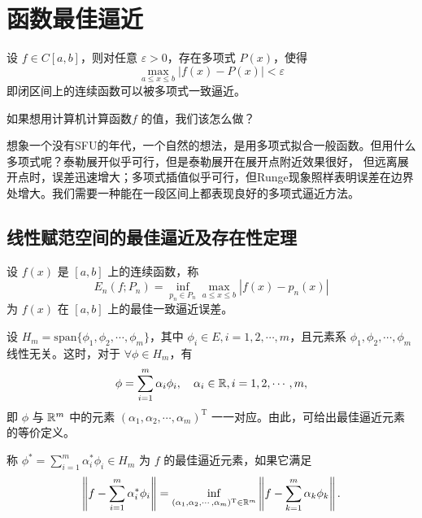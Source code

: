 \chapter{函数最佳逼近}

\begin{theorem}
    设 \(f \in C[a, b]\)，则对任意 \(\varepsilon > 0\)，存在多项式 \(P(x)\)，使得
    \[
        \max_{a \le x \le b} |f(x) - P(x)| < \varepsilon
    \]
    即闭区间上的连续函数可以被多项式一致逼近。
\end{theorem}

如果想用计算机计算函数\(f\) 的值，我们该怎么做？

想象一个没有SFU的年代，一个自然的想法，是用多项式拟合一般函数。但用什么多项式呢？泰勒展开似乎可行，但是泰勒展开在展开点附近效果很好，
但远离展开点时，误差迅速增大；多项式插值似乎可行，但Runge现象照样表明误差在边界处增大。我们需要一种能在一段区间上都表现良好的多项式逼近方法。

\section{线性赋范空间的最佳逼近及存在性定理}
\begin{definition}
    设 \(f(x)\) 是 \([a, b]\) 上的连续函数，称
    \begin{equation}
        E_n(f; P_n) = \inf_{p_n \in P_n} \max_{a \le x \le b} |f(x) - p_n(x)|
    \end{equation}
    为 \(f(x)\) 在 \([a, b]\) 上的最佳一致逼近误差。
\end{definition}
设 \(H_m = \text{span}\{\phi_1, \phi_2, \cdots, \phi_m\}\)，其中 \(\phi_i
\in E, i = 1, 2, \cdots, m\)，且元素系 \(\phi_1, \phi_2, \cdots, \phi_m\)
线性无关。这时，对于 \(\forall \phi \in H_m\)，有
\[
    \phi = \sum_{i=1}^m \alpha_i \phi_i, \quad \alpha_i \in
    \mathbb{R}, i = 1, 2, \cdots, m,
\]
即 \(\phi\) 与 \(\mathbb{R}^m\) 中的元素 \((\alpha_1, \alpha_2, \cdots,
\alpha_m)^{\mathrm{T}}\) 一一对应。由此，可给出最佳逼近元素的等价定义。

\begin{definition}
    称 \(\phi^* = \sum_{i=1}^m \alpha_i^* \phi_i \in H_m\) 为 \(f\) 的最佳逼近元素，如果它满足
    \begin{equation}
        \left\| f - \sum_{i=1}^m \alpha_i^* \phi_i \right\| =
        \inf_{(\alpha_1, \alpha_2, \cdots, \alpha_m)^{\mathrm{T}} \in
        \mathbb{R}^m} \left\| f - \sum_{k=1}^m \alpha_k \phi_k \right\|.
    \end{equation}
\end{definition}

